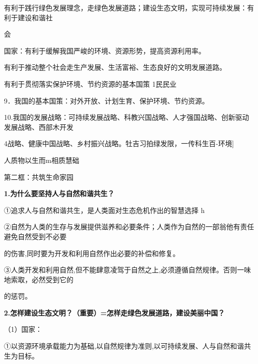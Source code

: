\documentclass[lang=cn,11pt]{elegantbook}
\newcommand{\daofasym}[1]{{\daofasymbolfont #1}}
\newcommand{\daofasym}[1]{#1}
\begin{document}
有利于践行绿色发展理念，走绿色发展道路；建设生态文明，实现可持续发展：有利于建设和谐社\par

会\par

国家：有利于缓解我国严峻的环境、资源形势，提高资源利用率。\par

有利于推动整个社会走生产发展、生活富裕、生态良好的文明发展道路。\par

有利于贯彻落实保护环境、节约资源的基本国策 1民民业\par

9．我国的基本国策：对外开放、计划生育、保护环境、节约资源。\par

10.我国的发展战略：可持续发展战略、科教兴国战略、人才强国战略、创新驱动发展战略、西部木开发\par

4战略、健康中国战略、乡村振兴战略。牡吉习拍绿发限，一传科生百-环境]\par

人质物以生而m相质慧础\par

第二框：共筑生命家园\par

\textbf{1.为什么要坚持人与自然和谐共生？}\par

\daofasym{①}追求人与自然和谐共生，是人类面对生态危机作出的智慧选择 h\par

\daofasym{②}自然为人类的生存与发展提供滋养和必要条件；人类作为自然的一部翁他有责任避免自然受到不必要\par

的伤害,同时要为开发和利用自然作出必要的补偿和修复。\par

\daofasym{③}人类开发和利用自然,但不能肆意凌驾于自然之上,必须遵循自然规律。否则一味地索取，必然受到它的\par

的惩罚。\par

\textbf{2.怎样建设生态文明？（重要）=怎样走绿色发展道路，建设美丽中国？}\par

（1）国家：\par

\daofasym{①}以资源环境承载能力为基础,以自然规律为准则,以可持续发展、人与自然和谐共生为目标。\par
\end{document}
